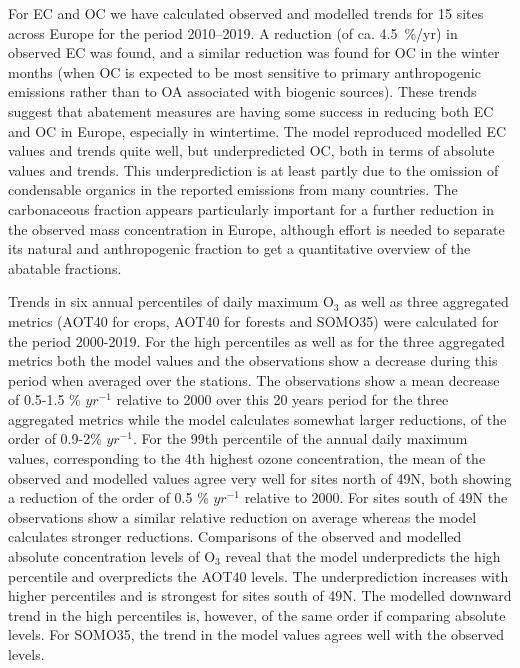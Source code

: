 For EC and OC we have calculated observed and modelled trends for 15 sites across Europe for the period 2010--2019. A reduction (of ca. 4.5~\%/yr) in observed EC was found, and a similar reduction was found for OC in the winter months (when OC is expected to be most sensitive to primary anthropogenic emissions rather than to OA associated with biogenic sources). These trends suggest that abatement measures are having some success in reducing both EC and OC in Europe, especially in wintertime.  The model reproduced modelled EC values and trends quite well, but underpredicted OC, both in terms of absolute values and trends. This underprediction is at least partly due to the omission of condensable organics in the reported emissions from many countries. 
%
The carbonaceous fraction appears particularly important for a
further reduction in the observed \pmfine mass concentration in Europe,
although effort is needed to separate its natural and anthropogenic
fraction to get a quantitative overview of the abatable fractions.


Trends in six annual percentiles of daily maximum O$_3$ as well as three aggregated metrics (AOT40 for crops, AOT40 for forests and SOMO35) were calculated for the period 2000-2019. For the high percentiles as well as for the three aggregated metrics both the model values and the observations show a decrease during this period when averaged over the stations. The observations show a mean decrease of 0.5-1.5 \% $yr^{-1}$ relative to 2000 over this 20 years period for the three aggregated metrics while the model calculates somewhat larger reductions, of the order of 0.9-2\% $yr^{-1}$. For the 99th percentile of the annual daily maximum values, corresponding to the 4th highest ozone concentration, the mean of the observed and modelled values agree very well for sites north of 49\degrees N, both showing a reduction of the order of 0.5  \% $yr^{-1}$ relative to 2000. For sites south of 49\degrees N the observations show a similar relative reduction on average whereas the model calculates stronger reductions. Comparisons of the observed and modelled absolute concentration levels of O$_3$ reveal that the model underpredicts the high percentile and overpredicts the AOT40 levels. The underprediction increases with higher percentiles and is strongest for sites south of 49\degrees N. The modelled downward trend in the high percentiles is, however, of the same order if comparing absolute levels. For SOMO35, the trend in the model values agrees well with the observed levels.

